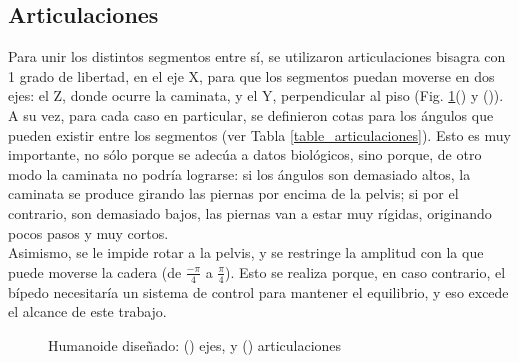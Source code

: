 \documentclass{article}
\begin{document}

\subsection{Articulaciones}
Para unir los distintos segmentos entre s\'i, se utilizaron articulaciones bisagra con 1 grado de libertad, en el eje X, para que los segmentos puedan moverse en dos ejes: el Z, donde ocurre la caminata, y el Y, perpendicular al piso (Fig. \ref{fig:seg_and_art}(\protect{}) y (\protect{})). \\
A su vez, para cada caso en particular, se definieron cotas para los \'angulos que pueden existir entre los segmentos (ver Tabla \ref{table_articulaciones}). Esto es muy importante, no s\'olo porque se adec\'ua a datos biol\'ogicos, sino porque, de otro modo la caminata no podr\'ia lograrse: si los \'angulos son demasiado altos, la caminata se produce girando las piernas por encima de la pelvis; si por el contrario, son demasiado bajos, las piernas van a estar muy r\'igidas, originando pocos pasos y muy cortos.\\
Asimismo, se le impide rotar a la pelvis, y se restringe la amplitud con la que puede moverse la cadera (de $\frac{-\pi}{4}$ a $\frac{\pi}{4}$). Esto se realiza porque, en caso contrario, el b\'ipedo necesitar\'ia un sistema de control para mantener el equilibrio, y eso excede el alcance de este trabajo.

\begin{figure}[H]%
  \centering
  \qquad
  \caption{Humanoide dise\~nado: (\protect{}) ejes, y (\protect{}) articulaciones}%
  \label{fig:seg_and_art} %
\end{figure}
\end{document}
